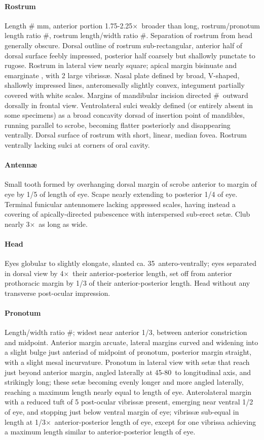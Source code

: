 \documentclass[fleqn,10pt,lineno]{wlpeerj} %
\newcommand{\td}{\textdegree~}
\newcommand{\x}{$\times$~}
\begin{document}
			\paragraph{Rostrum}
				Length \# mm, anterior portion 1.75-2.25\x broader than long, rostrum/pronotum length ratio \#, rostrum length/width ratio \#.
				Separation of rostrum from head generally obscure. 
				Dorsal outline of rostrum sub-rectangular, anterior half of dorsal surface feebly impressed, posterior half coarsely but shallowly punctate to rugose. 
				Rostrum in lateral view nearly square; apical margin bisinuate and emarginate , with 2 large vibriss{\ae}. 
				Nasal plate defined by broad, V-shaped, shallowly impressed lines, anteromesally slightly convex, integument partially covered with white scales. 
				Margins of mandibular incision directed \#\td outward dorsally in frontal view. 
				Ventrolateral sulci weakly defined (or entirely absent in some specimens) as a broad concavity dorsad of insertion point of mandibles, running parallel to scrobe, becoming flatter posteriorly and disappearing ventrally.
				Dorsal surface of rostrum with  short, linear, median fovea.
				Rostrum ventrally lacking sulci at corners of oral cavity.
			\paragraph{Antenn{\ae}}
				Small tooth formed by overhanging dorsal margin of scrobe anterior to margin of eye by 1/5 of length of eye.
				Scape nearly extending to posterior 1/4 of eye.
				Terminal funicular antennomere lacking appressed scales, having instead a covering of apically-directed pubescence with interspersed sub-erect set{\ae}.
				Club nearly 3\x as long as wide.
			\paragraph{Head}
				Eyes globular to slightly elongate, slanted ca. 35\td antero-ventrally; eyes separated in dorsal view by 4\x their anterior-posterior length, set off from anterior prothoracic margin by 1/3 of their anterior-posterior length. 
				Head without any transverse post-ocular impression.
			\paragraph{Pronotum}
				Length/width ratio \#; widest near anterior 1/3, between anterior constriction and midpoint. 
				Anterior margin arcuate, lateral margins curved and widening into a slight bulge just anteriad of midpoint of pronotum, posterior margin straight, with a slight mesal incurvature. 
				Pronotum in lateral view with set{\ae} that reach just beyond anterior margin, angled laterally at 45-80\td to longitudinal axis, and strikingly long; these set{\ae} becoming evenly longer and more angled laterally, reaching a maximum length nearly equal to length of eye. 
				Anterolateral margin with a reduced tuft of 5 post-ocular vibriss{\ae} present, emerging near ventral 1/2 of eye, and stopping just below ventral margin of eye; vibriss{\ae} sub-equal in length at 1/3\x anterior-posterior length of eye, except for one vibrissa achieving a maximum length similar to anterior-posterior length of eye.
\end{document}
